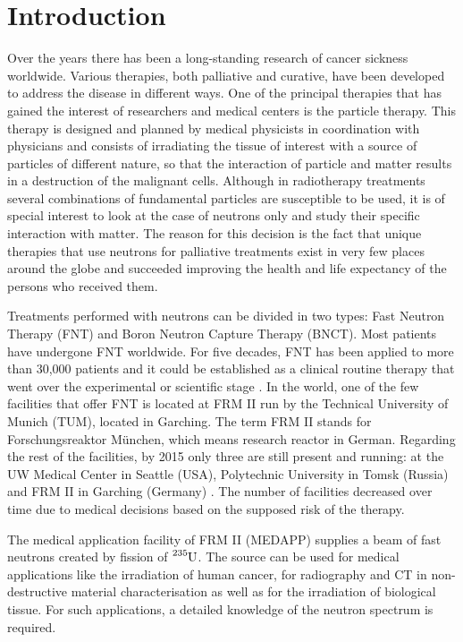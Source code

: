 \chapter{Introduction}

Over the years there has been a long-standing research of cancer sickness worldwide. Various therapies, both palliative and curative, have been developed to address the disease in different ways. One of the principal therapies that has gained the interest of researchers and medical centers is the particle therapy. This therapy is designed and planned by medical physicists in coordination with physicians and consists of irradiating the tissue of interest with a source of particles of different nature, so that the interaction of particle and matter results in a destruction of the malignant cells. Although in radiotherapy treatments several combinations of fundamental particles are susceptible to be used, it is of special interest to look at the case of neutrons only and study their specific interaction with matter. The reason for this decision is the fact that unique therapies that use neutrons for palliative treatments exist in very few places around the globe and succeeded improving the health and life expectancy of the persons who received them. 

Treatments performed with neutrons can be divided in two types: Fast Neutron Therapy (FNT) and Boron Neutron Capture Therapy (BNCT). Most patients have undergone FNT worldwide. For five decades, FNT has been applied to more than 30,000 patients and it could be established as a clinical routine therapy that went over the experimental or scientific stage \cite{wagner2015FNTstatus}.
In the world, one of the few facilities that offer FNT is located at FRM II run by the Technical University of Munich (TUM), located in Garching. The term FRM II stands for Forschungsreaktor München, which means research reactor in German. Regarding the rest of the facilities, by 2015 only three are still present and running: at the UW Medical Center in Seattle (USA), Polytechnic University in Tomsk (Russia) and FRM II in Garching (Germany) \cite{wagner2015FNTstatus}. The number of facilities decreased over time due to  medical decisions based on the supposed risk of the therapy. 

The medical application facility of FRM II (MEDAPP) supplies a beam of fast neutrons created by fission of $\ce{^{235}{}U}$. The source can be used for medical applications like the irradiation of human cancer, for radiography and CT in non-destructive material characterisation as well as for the irradiation of biological tissue. For such applications, a detailed knowledge of the neutron spectrum is required.

